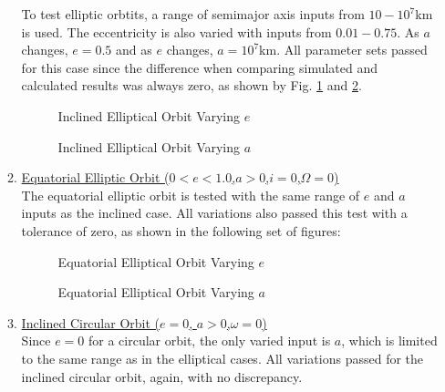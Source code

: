 \begin{itemize}
\begin{enumerate}
		To test elliptic orbtits, a range of semimajor axis inputs from $10-10^7$km is used. The eccentricity is also varied with inputs from $0.01-0.75$. As $a$ changes, $e=0.5$ and as $e$ changes, $a=10^7$km. All parameter sets passed for this case since the difference when comparing simulated and calculated results was always zero, as shown by Fig. \ref{fig:2} and \ref{fig:3}.
\begin{figure}[H] 
	\centering
	\caption{Inclined Elliptical Orbit Varying $e$}\label{fig:2}
\end{figure}
\begin{figure}[H]
	\centering
	\caption{Inclined Elliptical Orbit Varying $a$}\label{fig:3}
\end{figure}
\pagebreak
		\item \underline{Equatorial Elliptic Orbit ($0<e<1.0$,\quad $a>0$,\quad $i=0$,\quad $\Omega=0$)}\\
		The equatorial elliptic orbit is tested with the same range of $e$ and $a$ inputs as the inclined case. All variations also passed this test with a tolerance of zero, as shown in the following set of figures:
		\begin{figure}[H] \label{fig:4}
	\centering
	\caption{Equatorial Elliptical Orbit Varying $e$}
\end{figure}
\begin{figure}[H] \label{fig:5}
	\centering
	\caption{Equatorial Elliptical Orbit Varying $a$}
\end{figure}
		\pagebreak
		\item \underline{Inclined Circular Orbit ($e=0$, \quad $a>0$,\quad $\omega=0$)}\\
		Since $e=0$ for a circular orbit, the only varied input is $a$, which is limited to the same range as in the elliptical cases. All variations passed for the inclined circular orbit, again, with no discrepancy.
		\begin{figure}[H] \label{fig:6}

\end{figure}
\end{enumerate}
\end{itemize}
